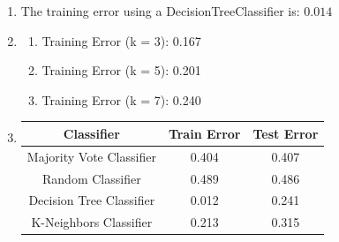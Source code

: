 \documentclass[11pt]{article}
\newcommand{\solution}[1]{{{\color{blue}{\bf Solution:} {#1}}}}
\begin{document}
\begin{enumerate}
\item
\solution{} \newline
The training error using a DecisionTreeClassifier is: $0.014$

\item
\solution{}
\begin{enumerate}
\item Training Error (k = 3): 0.167
\item Training Error (k = 5): 0.201
\item Training Error (k = 7): 0.240
\end{enumerate}

\item
\solution{}
\begin{center}
\begin{tabular}{| c | c | c |}
\hline
Classifier & Train Error & Test Error \\
\hline
Majority Vote Classifier & 0.404 & 0.407 \\
\hline
Random Classifier & 0.489 & 0.486 \\
\hline
Decision Tree Classifier & 0.012 & 0.241 \\
\hline
K-Neighbors Classifier & 0.213 & 0.315 \\
\hline


\end{tabular}
\end{center}
\end{enumerate}
\end{document}
